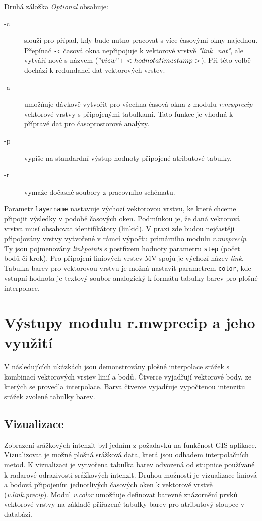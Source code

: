 \documentclass[a4paper,12pt,oneside]{report}
\begin{document}
Druhá záložka \textit{Optional} obsahuje:
\begin{description}
\item[-c] slouží pro případ, kdy bude nutno pracovat s více časovými
  okny najednou. Přepínač \texttt{-c} časová okna nepřipojuje k
  vektorové vrstvě \textit{"link\_nat"}, ale vytváří nové s názvem
  ($"view" + <hodnota timestamp>$). Při této volbě dochází k
  redundanci dat vektorových vrstev.
\item[-a] umožňuje dávkově vytvořit pro všechna časová okna z modulu
  \textit{r.mwprecip} vektorové vrstvy s připojenými tabulkami. Tato
  funkce je vhodná k přípravě dat pro časoprostorové analýzy.
\item[-p] vypíše na standardní výstup hodnoty připojené atributové
  tabulky.
\item[-r] vymaže dočasné soubory z pracovního schématu.
\end{description}


Parametr \texttt{layername} nastavuje výchozí vektorovou vrstvu, ke
které chceme při\-pojit výsledky v podobě časových oken. Podmínkou je,
že daná vektorová vrstva musí obsahovat identifikátory (linkid). V
praxi zde budou nejčastěji připojovány vrstvy vytvořené v rámci
výpočtu primárního modulu \textit{r.mwprecip}. Ty jsou pojmenovány
\textit{linkpoints} s postfixem hodnoty parametru \texttt{step} (počet
bodů či krok). Pro připojení liniových vrstev MV spojů je výchozí
název \textit{link}.  Tabulka barev pro vektorovou vrstvu je možná
nastavit parametrem \texttt{color}, kde vstupní hodnota je textový
soubor analogický k formátu tabulky barev pro plošné interpolace.




\newpage
\setcounter{footnote}{1}
\section{Výstupy modulu r.mwprecip a jeho využití}
V následujících ukázkách jsou demonstrovány plošné interpolace srážek s kombinací
vektorových vrstev linií a bodů. Čtverce vyjadřují vektorové body, ze kterých se provedla
interpolace. Barva čtverce vyjadřuje vypočtenou intenzitu srážek zvolené tabulky
barev.


\subsection{Vizualizace}
Zobrazení srážkových intenzit byl jedním z požadavků na funkčnost GIS
aplikace. Vizualizovat je možné plošná srážková data, která jsou odhadem
interpolačních metod. K vizualizaci je vytvořena tabulka barev
odvozená od stupnice používané k radarové odrazivosti srážkových
intenzit. Druhou možností je vizualizace liniová a bodová připojením
jednotlivých časových oken k vektorové vrstvě
(\textit{v.link.precip}). Modul \textit{v.color} umožňuje definovat
barevné znázornění prvků vektorové vrstvy na základě přiřazené tabulky
barev pro atributový sloupec v databázi.
\end{document}
